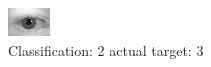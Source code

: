 \begin{figure}[h!]
\begin{center}
\includegraphics[width=0.60\columnwidth]{figures/ID530_class_2_target_3.png}
\end{center}
\caption{ Classification: 2 actual target: 3}
\label{fig:ID530_class_2_target_3}
\end{figure}
